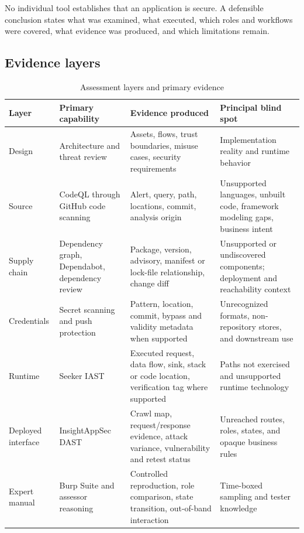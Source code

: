 \documentclass[11pt,letterpaper]{article}
\begin{document}
\begin{keybox}
No individual tool establishes that an application is secure. A defensible conclusion states what was examined, what executed, which roles and workflows were covered, what evidence was produced, and which limitations remain.
\end{keybox}

\subsection{Evidence layers}

\begin{table}[H]
\centering
\caption{Assessment layers and primary evidence}
\label{tab:evidence-layers}
\small
\begin{tabularx}{\textwidth}{@{}L{1.25in}L{1.45in}Y Y@{}}
\toprule
\textbf{Layer} & \textbf{Primary capability} & \textbf{Evidence produced} & \textbf{Principal blind spot} \\
\midrule
Design & Architecture and threat review & Assets, flows, trust boundaries, misuse cases, security requirements & Implementation reality and runtime behavior \\
Source & CodeQL through GitHub code scanning & Alert, query, path, locations, commit, analysis origin & Unsupported languages, unbuilt code, framework modeling gaps, business intent \\
Supply chain & Dependency graph, Dependabot, dependency review & Package, version, advisory, manifest or lock-file relationship, change diff & Unsupported or undiscovered components; deployment and reachability context \\
Credentials & Secret scanning and push protection & Pattern, location, commit, bypass and validity metadata when supported & Unrecognized formats, non-repository stores, and downstream use \\
Runtime & Seeker IAST & Executed request, data flow, sink, stack or code location, verification tag where supported & Paths not exercised and unsupported runtime technology \\
Deployed interface & InsightAppSec DAST & Crawl map, request/response evidence, attack variance, vulnerability and retest status & Unreached routes, roles, states, and opaque business rules \\
Expert manual & Burp Suite and assessor reasoning & Controlled reproduction, role comparison, state transition, out-of-band interaction & Time-boxed sampling and tester knowledge \\
\bottomrule
\end{tabularx}
\end{table}
\end{document}

